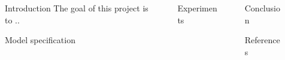 \documentclass[final]{beamer}
\newlength{\sepwidth}
\newlength{\colwidth}
\newcommand{\separatorcolumn}{\begin{column}{\sepwidth}\end{column}}
\begin{document}
\begin{frame}[t]
\begin{columns}[t]
\separatorcolumn

\begin{column}{\colwidth}

  \begin{block}{Introduction}
  The goal of this project is to ..
  \lipsum[5]
  
  \end{block}
\vspace{-7mm}
 
\begin{block}{Model specification}
\lipsum[8]

\end{block}

\end{column}

\separatorcolumn

\begin{column}{\colwidth}

\begin{block}{Experiments}
\lipsum[10]
 
\end{block}

\end{column}

\separatorcolumn

\begin{column}{\colwidth}



\begin{block}{Conclusion}
\lipsum[5]
\end{block}

\begin{block}{References}
\vspace{-1mm}
\nocite{*}
\footnotesize{}

\end{block}

\end{column}

\separatorcolumn
\end{columns}
\end{frame}
\end{document}
